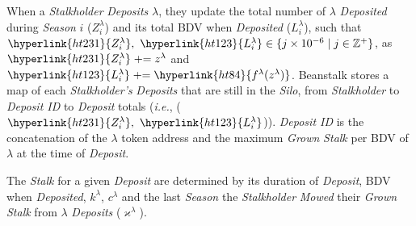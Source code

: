 \documentclass[tikz]{article}
\newcommand{\term}[1]{\textsl{#1}}
\begin{document}
When a \term{Stalkholder} \term{Deposits} \hyperlink{ht126}{$\lambda$}, they update the total number of \hyperlink{ht126}{$\lambda$} \term{Deposited} during \term{Season} $i$ (\hyperlink{ht231}{$Z_i^{\lambda}$}) and its total BDV when \term{Deposited} (\hyperlink{ht123}{$L_i^{\lambda}$}), such that $\hyperlink{ht231}{Z_i^{\lambda}},\ \hyperlink{ht123}{L_i^{\lambda}} \in \{j \times 10^{-6} \mid j \in \mathbb{Z}^{+} \}$, as $\hyperlink{ht231}{Z_i^{\lambda}} \mathrel{+}= z^{\lambda}$ and $\hyperlink{ht123}{L_i^{\lambda}} \mathrel{+}= \hyperlink{ht84}{f^{\lambda}(z^{\lambda})}$. Beanstalk stores a map of each \term{Stalkholder's} \term{Deposits} that are still in the \term{Silo}, from \term{Stalkholder} to \term{Deposit ID} to \term{Deposit} totals (\term{i.e.}, ($\hyperlink{ht231}{Z_i^{\lambda}},\ \hyperlink{ht123}{L_i^{\lambda}}$)). \term{Deposit ID} is the concatenation of the \hyperlink{ht126}{$\lambda$} token address and the maximum \term{Grown} \term{Stalk} per BDV of \hyperlink{ht126}{$\lambda$} at the time of \term{Deposit}.

The \term{Stalk} for a given \term{Deposit} are determined by its duration of \term{Deposit}, BDV when \term{Deposited}, \hyperlink{ht120}{$k^{\lambda}$}, \hyperlink{ht32}{$c^{\lambda}$} and the last \term{Season} the \term{Stalkholder} \term{Mowed} their \term{Grown} \term{Stalk} from \hyperlink{ht126}{$\lambda$} \term{Deposits} (\hyperlink{ht122}{$\varkappa^{\lambda}$}).
\end{document}
